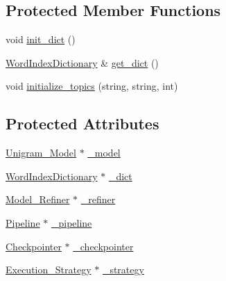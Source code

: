 \subsection*{Protected Member Functions}
\begin{DoxyCompactItemize}
\item 
void \hyperlink{class_unigram___model___training___builder_a5916d53b0ba0c60d64697d9e420b7432}{init\_\-dict} ()
\item 
\hyperlink{class_word_index_dictionary}{WordIndexDictionary} \& \hyperlink{class_unigram___model___training___builder_a6751bf1cff94a4173bb0e4000090161b}{get\_\-dict} ()
\item 
void \hyperlink{class_unigram___model___training___builder_a1ae126c30790abdf2ede9e885dab848d}{initialize\_\-topics} (string, string, int)
\end{DoxyCompactItemize}
\subsection*{Protected Attributes}
\begin{DoxyCompactItemize}
\item 
\hyperlink{class_unigram___model}{Unigram\_\-Model} $\ast$ \hyperlink{class_unigram___model___training___builder_a0d53dd16af10325a2005562593ea254d}{\_\-model}
\item 
\hyperlink{class_word_index_dictionary}{WordIndexDictionary} $\ast$ \hyperlink{class_unigram___model___training___builder_aeba918f38fe252eacd18e4c5912f1847}{\_\-dict}
\item 
\hyperlink{class_model___refiner}{Model\_\-Refiner} $\ast$ \hyperlink{class_unigram___model___training___builder_a4afccdf5cdd23d88883e4b7793345cd6}{\_\-refiner}
\item 
\hyperlink{class_pipeline}{Pipeline} $\ast$ \hyperlink{class_unigram___model___training___builder_a45916934a9ad507fae26423b4f264723}{\_\-pipeline}
\item 
\hyperlink{class_checkpointer}{Checkpointer} $\ast$ \hyperlink{class_unigram___model___training___builder_a8c0687e2b469e2b541e7cd282e893383}{\_\-checkpointer}
\item 
\hyperlink{class_execution___strategy}{Execution\_\-Strategy} $\ast$ \hyperlink{class_unigram___model___training___builder_a15d25a41a50233e6856e14c4eb445628}{\_\-strategy}
\end{DoxyCompactItemize}


